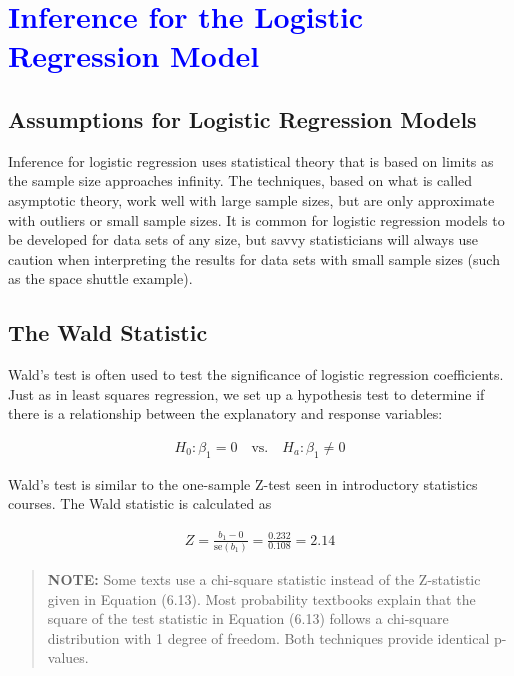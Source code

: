 \documentclass[
]{report}
\begin{document}
\hypertarget{section-65}{%
\section{\texorpdfstring{\textcolor{blue}{ Inference for the Logistic Regression Model}}{}}\label{section-65}}

\hypertarget{assumptions-for-logistic-regression-models}{%
\subsection*{Assumptions for Logistic Regression Models}\label{assumptions-for-logistic-regression-models}}

Inference for logistic regression uses statistical theory that is based on limits as the sample size approaches infinity. The techniques, based on what is called asymptotic theory, work well with large sample sizes, but are only approximate with outliers or small sample sizes. It is common for logistic regression models to be developed for data sets of any size, but savvy statisticians will always use caution when interpreting the results for data sets with small sample sizes (such as the space shuttle example).

\hypertarget{the-wald-statistic}{%
\subsection*{The Wald Statistic}\label{the-wald-statistic}}

Wald's test is often used to test the significance of logistic regression coefficients. Just as in least squares regression, we set up a hypothesis test to determine if there is a relationship between the explanatory and response variables:

\begin{align*}
H_0: \beta_1 = 0 \quad \text{vs.}\quad H_a: \beta_1 \neq 0
\end{align*}

Wald's test is similar to the one-sample Z-test seen in introductory statistics courses. The Wald statistic is calculated as

\begin{align}
Z = \frac{b_1 - 0}{\text{se}(b_1)} = \frac{0.232}{0.108} = 2.14 
\tag{6.13}
\end{align}

\begin{quote}
\textbf{NOTE:} Some texts use a chi-square statistic instead of the Z-statistic given in Equation (6.13). Most probability textbooks explain that the square of the test statistic in Equation (6.13) follows a chi-square distribution with 1 degree of freedom. Both techniques provide identical p-values.
\end{quote}
\end{document}
